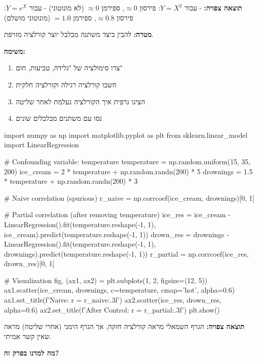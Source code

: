 \textbf{תוצאה צפויה:} 
- עבור $Y=X^2$: פירסון $\approx 0$, ספירמן $\approx 0$ (לא מונוטוני)
- עבור $Y=e^X$: פירסון $\approx 0.8$, ספירמן $= 1.0$ (מונוטוני מושלם)


\textbf{מטרה:} להבין כיצד משתנה מבלבל יוצר קורלציה מזויפת.

\textbf{משימה:}

\begin{enumerate}
\item צרו סימולציה של "גלידה, טביעות, חום"
\item חשבו קורלציה רגילה וקורלציה חלקית
\item הציגו גרפית איך הקורלציה נעלמת לאחר שליטה
\item נסו עם משתנים מבלבלים שונים
\end{enumerate}

\begin{pythonbox*}
import numpy as np
import matplotlib.pyplot as plt
from sklearn.linear_model import LinearRegression

# Confounding variable: temperature
temperature = np.random.uniform(15, 35, 200)
ice_cream = 2 * temperature + np.random.randn(200) * 5
drownings = 1.5 * temperature + np.random.randn(200) * 3

# Naive correlation (spurious)
r_naive = np.corrcoef(ice_cream, drownings)[0, 1]

# Partial correlation (after removing temperature)
ice_res = ice_cream - LinearRegression().fit(temperature.reshape(-1, 1), ice_cream).predict(temperature.reshape(-1, 1))
drown_res = drownings - LinearRegression().fit(temperature.reshape(-1, 1), drownings).predict(temperature.reshape(-1, 1))
r_partial = np.corrcoef(ice_res, drown_res)[0, 1]

# Visualization
fig, (ax1, ax2) = plt.subplots(1, 2, figsize=(12, 5))
ax1.scatter(ice_cream, drownings, c=temperature, cmap='hot', alpha=0.6)
ax1.set_title(f'Naive: r = {r_naive:.3f}')
ax2.scatter(ice_res, drown_res, alpha=0.6)
ax2.set_title(f'After Control: r = {r_partial:.3f}')
plt.show()
\end{pythonbox*}

\textbf{תוצאה צפויה:} הגרף השמאלי מראה קורלציה חזקה, אך הגרף הימני (אחרי שליטה) מראה שאין קשר אמיתי.


\textbf{מה למדנו בפרק זה?}

